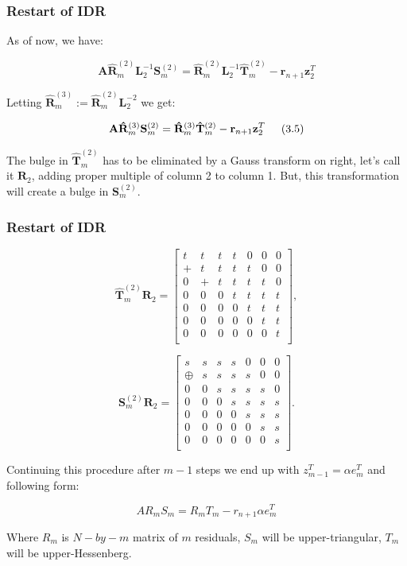\documentclass[mathserif]{beamer}
\begin{document}
\begin{frame}
\frametitle{Restart of IDR}
As of now, we have:

\[\mathbf{A} \mathbf{\hat R}_m^{(2)} \mathbf{L}_2^{-1}\mathbf{S}_m^{(2)}=\mathbf{\hat R}_m^{(2)}\mathbf{L}_2^{-1}\mathbf{\hat T}_m^{(2)}-\mathbf{r}_{n+1}\mathbf{z}_2^T\]

Letting $\mathbf{\hat R}_m^{(3)}:= \mathbf{\hat R}_m^{(2)}\mathbf{L}_2^{-2}$ we get:

\[\mathbf{A} \mathbf{\hat R}_m^{(3)}\mathbf{S}_m^{(2)}=\mathbf{\hat R}_m^{(3)} \mathbf{\hat T}_m^{(2)}-\mathbf{r}_{n+1}\mathbf{z}_2^T \hspace{.2in} (3.5)\]

\pause The bulge in $\mathbf{\hat T}_m^{(2)}$ has to be eliminated by a Gauss transform on right, let's call it $\mathbf{R}_2$, adding proper multiple of column 2 to column 1. But, this transformation will create a bulge in $\mathbf{S}_m^{(2)}$.
\end{frame}

\begin{frame}
\frametitle{Restart of IDR}
\[
\mathbf{\hat T}_m^{(2)} \mathbf{R}_2= \left[
\begin{array}{cccccccc}
t & t & t & t  & 0 & 0 & 0 \\
+ & t & t & t  & t & 0 & 0 \\
0 & +  & t  & t  & t & t & 0 \\
0 & 0  & 0  & t  & t & t & t \\
0 & 0  & 0  & 0  & t & t & t \\
0 & 0  & 0  & 0  & 0 & t & t\\
0 & 0  & 0  & 0  & 0 & 0 & t \\
\end{array}
\right], \]


\[\mathbf{S}_m^{(2)}\mathbf{R}_2=\left[
\begin{array}{cccccccc}
s & s & s & s  & 0 & 0 & 0 \\
\oplus & s & s & s  & s & 0 & 0 \\
0 & 0 & s & s & s & s & 0 \\
0 & 0  & 0  & s & s & s & s \\
0 & 0  & 0  & 0  & s & s & s \\
0 & 0  & 0  & 0  & 0 & s & s\\
0 & 0  & 0  & 0  & 0 & 0 & s \\
\end{array}
\right].
\]
\end{frame}

\begin{frame}
Continuing this procedure after $m-1$ steps we end up with $z_{m-1}^T= \alpha e_m^T$ and following form:

\[A R_m S_m = R_m T_m -r_{n+1} \alpha e_m^T\]

Where $R_m$ is $N-by-m$ matrix of $m$ residuals, $S_m$ will be upper-triangular, $T_m$ will be upper-Hessenberg.
\end{frame}
\end{document}
